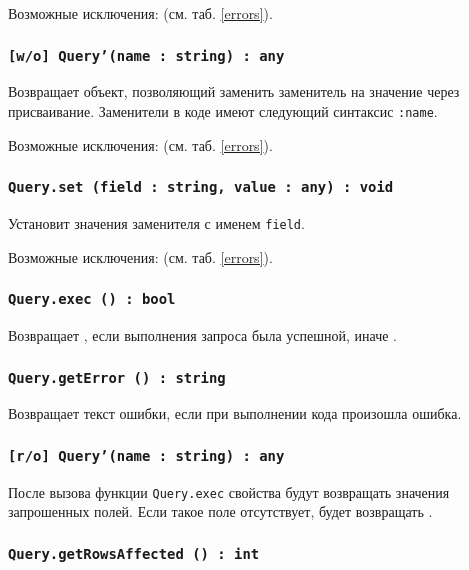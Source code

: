 Возможные исключения:  (см. таб. \ref{errors}).

\subsubsection{\texttt{[w/o] Query'(name : string) : any}}

Возвращает объект, позволяющий заменить заменитель на значение через присваивание. Заменители в коде имеют следующий синтаксис \texttt{:name}.

Возможные исключения:  (см. таб. \ref{errors}).

\subsubsection{\texttt{Query.set (field : string, value : any) : void}}

Установит значения заменителя с именем \texttt{field}.

Возможные исключения:  (см. таб. \ref{errors}).

\subsubsection{\texttt{Query.exec () : bool}}

Возвращает \true, если выполнения запроса была успешной, иначе \false.

\subsubsection{\texttt{Query.getError () : string}}

Возвращает текст ошибки, если при выполнении кода произошла ошибка.

\subsubsection{\texttt{[r/o] Query'(name : string) : any}}

После вызова функции \texttt{Query.exec} свойства будут возвращать значения запрошенных полей. Если такое поле отсутствует, будет возвращать \void.

\subsubsection{\texttt{Query.getRowsAffected () : int}}

